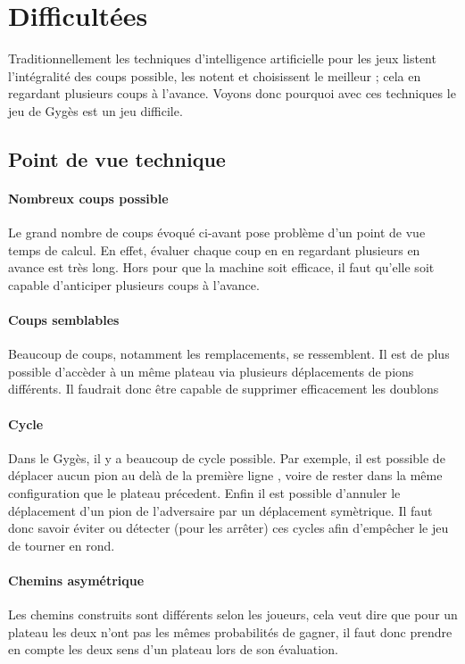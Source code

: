 \section{Difficultées}

	Traditionnellement les techniques d'intelligence artificielle pour les jeux listent l'intégralité des coups
	possible, les notent et choisissent le meilleur ; cela en regardant plusieurs coups à l'avance.
	Voyons donc pourquoi avec ces techniques le jeu de Gygès est un jeu difficile.

	\subsection{Point de vue technique}

		\paragraph{Nombreux coups possible} Le grand nombre de coups évoqué ci-avant pose problème d'un point de vue temps de calcul.
		En effet, évaluer chaque coup en en regardant plusieurs en avance est très long. Hors pour que la machine soit efficace, il faut qu'elle
		soit capable d'anticiper plusieurs coups à l'avance.

		\paragraph{Coups semblables} Beaucoup de coups, notamment les remplacements, se ressemblent. Il est de plus possible d'accèder à un même plateau
		via plusieurs déplacements de pions différents. Il faudrait donc être capable de supprimer efficacement les doublons

		\paragraph{Cycle} Dans le Gygès, il y a beaucoup de cycle possible. Par exemple, il est possible de déplacer aucun pion au delà de la première
		ligne , voire de rester dans la même configuration que le plateau précedent. Enfin il est possible d'annuler le déplacement d'un pion de
		l'adversaire par un déplacement symètrique. Il faut donc savoir éviter ou détecter (pour les arrêter) ces cycles afin d'empêcher le jeu
		de tourner en rond.

		\paragraph{Chemins asymétrique} Les chemins construits sont différents selon les joueurs, cela veut dire
		que pour un plateau les deux n'ont pas les mêmes probabilités de gagner, il faut donc prendre en compte les
		deux sens d'un plateau lors de son évaluation.

